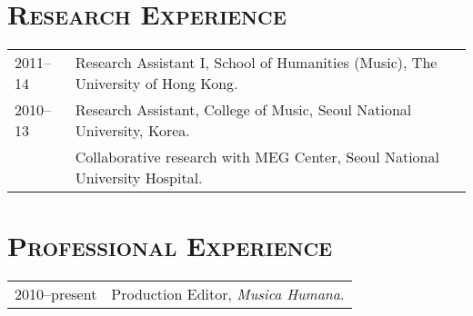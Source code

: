 \documentclass[a4paper,11pt]{article}
\begin{document}
  \section*{\textsc{Research Experience}}
  
  \hspace*{-0.25cm}
  \begin{tabular}{p{2.5cm} l}
    2011--14 & Research Assistant I, School of Humanities (Music), The University of Hong Kong.\\
    
    2010--13 & Research Assistant, College of Music, Seoul National University, Korea.\\
    & Collaborative research with MEG Center, Seoul National University Hospital.
  \end{tabular}
  
  \vspace{2.5mm}
  
  \section*{\textsc{Professional Experience}}
  
  \hspace*{-0.25cm}
  \begin{tabular}{p{2.5cm} l}
    2010--present & Production Editor, \textit{Musica Humana}.
  \end{tabular}
  
  \vspace{2.5mm}
  
%  
%  
\end{document}
